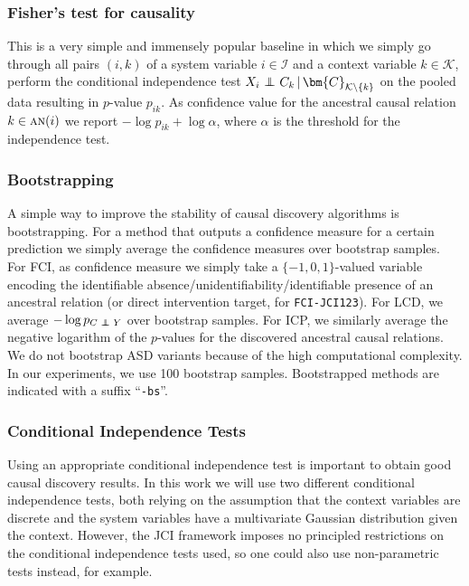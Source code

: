 \documentclass[twoside,11pt]{article}
\DeclareMathOperator*{\CI}{{\,\perp\mkern-12mu\perp\,}}
\newcommand\B[1]{\bm{#1}}
\newcommand\C[1]{\mathcal{#1}}
\newcommand\mathbfsc[1]{\text{\normalfont\scshape#1}}
\newcommand\an[1]{\mathbfsc{an}(#1)}
\newcommand\given{\,|\,}
\newcommand{\alg}[1]{\texttt{#1}}
\begin{document}
\subsubsection{Fisher's test for causality}\label{sec:Fisher}

This is a very simple and immensely popular baseline in which we simply go through
all pairs $(i,k)$ of a system variable $i \in \C{I}$ and a context variable $k
\in \C{K}$, perform the conditional independence test $X_i \CI C_k \given
\B{C}_{\C{K} \setminus \{k\}}$ on the pooled data resulting in $p$-value
$p_{ik}$. As confidence value for the ancestral causal relation $k \in
\an{i}$ we report $-\log p_{ik} + \log \alpha$, where $\alpha$ is the
threshold for the independence test.

\subsubsection{Bootstrapping}

A simple way to improve the stability of causal discovery algorithms is
bootstrapping. For a method that outputs a confidence measure for a certain
prediction we simply average the confidence measures over bootstrap samples.
For FCI, as confidence measure we simply take a $\{-1,0,1\}$-valued variable encoding the
identifiable absence/unidentifiability/identifiable presence of an ancestral
relation (or direct intervention target, for \alg{FCI-JCI123}). 
For LCD, we average $-\log p_{C\CI Y}$ over bootstrap samples. 
For ICP, we similarly average the negative logarithm of the $p$-values for the
discovered ancestral causal relations. We do not bootstrap ASD variants because
of the high computational complexity.
In our experiments, we use 100 bootstrap samples. Bootstrapped methods are indicated
with a suffix ``\alg{-bs}''.

\subsubsection{Conditional Independence Tests\label{sec:CI}}

Using an appropriate conditional independence test is important to obtain good causal discovery results. In this work we will
use two different conditional independence tests, both relying on the assumption that the context variables are
discrete and the system variables have a multivariate Gaussian distribution given the context. However,
the JCI framework imposes no principled restrictions on the conditional independence tests used, so one
could also use non-parametric tests instead, for example.
\end{document}
